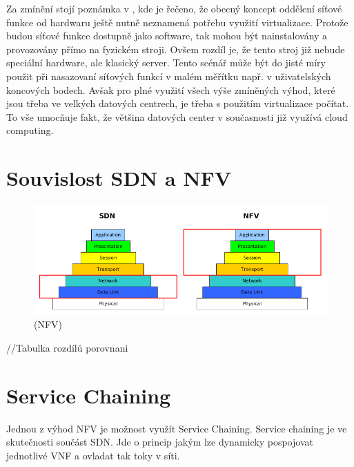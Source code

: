 Za zmínění stojí poznámka v \cite{NFVState}, kde je řečeno, že obecný koncept oddělení síťové funkce od hardwaru ještě nutně neznamená potřebu využití virtualizace. Protože budou síťové funkce dostupně jako software, tak mohou být nainstalovány a provozovány přímo na fyzickém stroji. Ovšem rozdíl je, že tento stroj již nebude speciální hardware, ale klasický server. Tento scénář může být do jisté míry použit při nasazovaní síťových funkcí v malém měřítku např. v uživatelských koncových bodech. Avšak pro plné využití všech výše zmíněných výhod, které jsou třeba ve velkých datových centrech, je třeba s použitím virtualizace počítat. To vše umocňuje fakt, že většina datových center v současnosti již využívá cloud computing. 

\section{Souvislost SDN a NFV}

\begin{figure}[h]
\begin{centering}
\includegraphics[scale=0.5]{images/sdn_nfv}
\par\end{centering}
\caption{ (NFV)\label{fig:vize_NFV}}
\end{figure}

//Tabulka rozdílů porovnani

\cite{Toward_NFV}

\section{Service Chaining} \label{sub:SDN}

Jednou z výhod NFV je možnost využít Service Chaining. Service chaining je ve skutečnosti součást SDN. Jde o princip jakým lze dynamicky pospojovat jednotlivé VNF a ovladat tak toky v síti. \cite{SDN_book}

